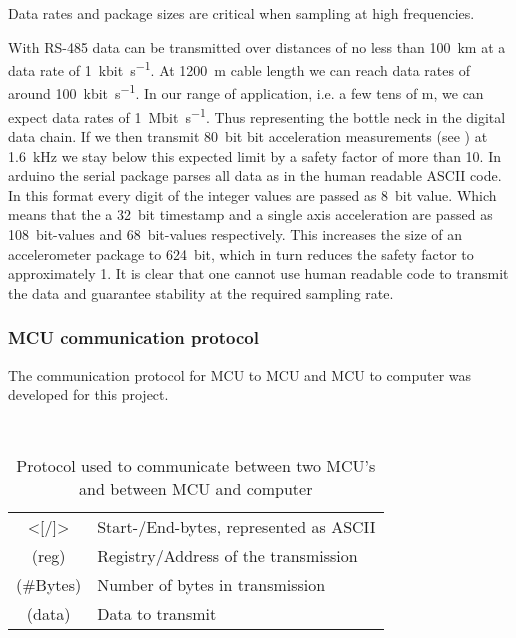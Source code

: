 Data rates and package sizes are critical when sampling at high frequencies. 

With \ac{RS}-485 data can be transmitted over distances of no less than \SI{100}{\km} at a data rate of \SI{1}{\kilo bit\per\second}. At \SI{1200}{\meter} cable length we can reach data rates of around \SI{100}{\kilo bit\per\second}. In our range of application, i.e. a few tens of \si{\meter}, we can expect data rates of \SI{1}{\mega bit\per\second}. Thus representing the bottle neck in the digital data chain. If we then transmit \SI{80}{bit} bit acceleration measurements (see ) at \SI{1.6}{\kilo\hertz} we stay below this expected limit by a safety factor of more than 10.
In arduino the serial package parses all data as in the human readable \ac{ASCII} code. In this format every digit of the integer values are passed as \SI{8}{bit} value. Which means that the a \SI{32}{bit} timestamp and a single axis acceleration are passed as 10\SI{8}{bit}-values and 6\SI{8}{bit}-values respectively. This increases the size of an accelerometer package to \SI{624}{bit}, which in turn reduces the safety factor to approximately 1.
It is clear that one cannot use human readable code to transmit the data and guarantee stability at the required sampling rate.


\subsubsection{MCU communication protocol}

The communication protocol for \ac{MCU} to \ac{MCU} and \ac{MCU} to computer was developed for this project.

\begin{table}[!htb]
    \centering
    
    \\[0.5em]
    \footnotesize
		\begin{tabular}{c@{ :\hskip 0.5em}l}
			\toprule
            \large{\textcolor{WesMixL8qual6}{<[}/\textcolor{WesMixL8qual6}{]>}} & Start-/End-bytes, represented as \ac{ASCII}\\
            \textcolor{WesMixL8qual0}{\large (reg)} & Registry/Address of the transmission\\
            \textcolor{WesMixL8qual4}{\large (\#Bytes)} & Number of bytes in transmission\\
            \textcolor{WesMixL8qual5}{\large (data)} & Data to transmit\\
			\bottomrule
		\end{tabular}
	\normalsize
    \caption[MCU communication protocol]{Protocol used to communicate between two MCU's and between MCU and computer}
    \label{tab:mcu_com_protocol}
\end{table}

